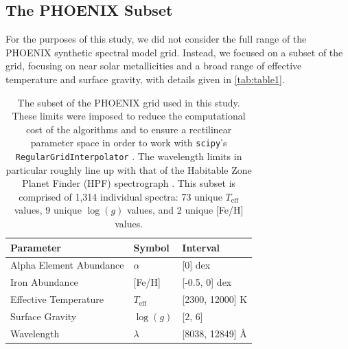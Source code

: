 \documentclass[twocolumn, linenumbers]{aastex631}
\begin{document}
\subsection{The PHOENIX Subset}
For the purposes of this study, we did not consider the full range of the PHOENIX synthetic spectral model grid. 
Instead, we focused on a subset of the grid, focusing on near solar metallicities and a broad range of effective temperature and surface gravity, with details given in \autoref{tab:table1}.

\begin{table}[h!]
    \centering
    \begin{tabular}{lll}
        \hline
        \bf{Parameter} & \bf{Symbol} & \bf{Interval}\\
        \hline
        Alpha Element Abundance & $\alpha$ & [0] dex\\
        Iron Abundance & [Fe/H] & [-0.5, 0] dex\\
        Effective Temperature & $T_{\mathrm{eff}}$ & [2300, 12000] K\\
        Surface Gravity & $\log(g)$ & [2, 6]\\
        Wavelength & $\lambda$ & [8038, 12849] \AA\\
        \hline
    \end{tabular}
    \caption{The subset of the PHOENIX grid used in this study. 
    These limits were imposed to reduce the computational cost of the algorithms and to ensure a rectilinear parameter space in order to work with \texttt{scipy}'s \texttt{RegularGridInterpolator} \citep{scipy}. 
    The wavelength limits in particular roughly line up with that of the Habitable Zone Planet Finder (HPF) spectrograph \citep{HPF}. 
    This subset is comprised of 1,314 individual spectra: 73 unique $T_{\mathrm{eff}}$ values, 9 unique $\log(g)$ values, and 2 unique [Fe/H] values.}
    \label{tab:table1}
\end{table}
\end{document}
